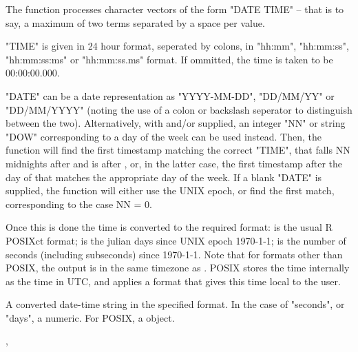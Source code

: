\documentclass[a4paper]{book}
\begin{document}
%
\begin{Details}\relax
The function processes character vectors of the form "DATE TIME" -- that is to say, a maximum of two terms separated by a space per value. 

"TIME" is given in 24 hour format, seperated by colons, in "hh:mm", "hh:mm:ss", "hh:mm:ss:ms" or "hh:mm:ss.ms" format. If ommitted, the time is taken to be 00:00:00.000.

"DATE" can be a date representation as "YYYY-MM-DD", "DD/MM/YY" or "DD/MM/YYYY" (noting the use of a colon or backslash seperator to distinguish between the two). Alternatively, with  and/or  supplied, an integer "NN" or string "DOW" corresponding to a day of the week can be used instead. Then, the function will find the first timestamp matching the correct "TIME", that falls NN midnights after  and is after , or, in the latter case, the first timestamp after the day of  that matches the appropriate day of the week. If a blank "DATE" is supplied, the function will either use the UNIX epoch, or find the first match, corresponding to the case NN = 0.

Once this is done the time is converted to the required format:  is the usual R POSIXct format;  is the julian days since UNIX epoch 1970-1-1;  is the number of seconds (including subseconds) since 1970-1-1. Note that for formats other than POSIX, the output is in the same timezone as . POSIX stores the time internally as the time in UTC, and applies a format that gives this time local to the user.
\end{Details}
%
\begin{Value}
A converted date-time string in the specified format. In the case of "seconds", or "days", a numeric. For POSIX, a  object.
\end{Value}
%
\begin{SeeAlso}\relax
{}, 
\end{SeeAlso}
%
\end{document}
